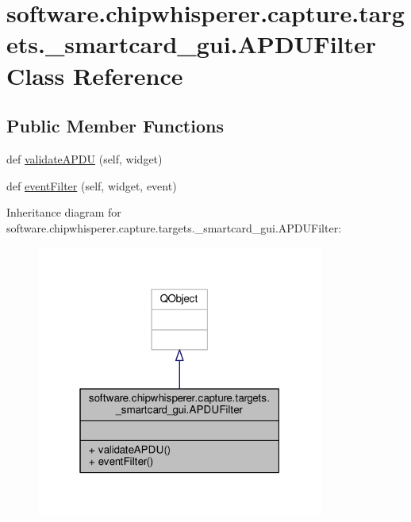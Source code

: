 \hypertarget{classsoftware_1_1chipwhisperer_1_1capture_1_1targets_1_1__smartcard__gui_1_1APDUFilter}{}\section{software.\+chipwhisperer.\+capture.\+targets.\+\_\+smartcard\+\_\+gui.\+A\+P\+D\+U\+Filter Class Reference}
\label{classsoftware_1_1chipwhisperer_1_1capture_1_1targets_1_1__smartcard__gui_1_1APDUFilter}
\subsection*{Public Member Functions}
\begin{DoxyCompactItemize}
\item 
def \hyperlink{classsoftware_1_1chipwhisperer_1_1capture_1_1targets_1_1__smartcard__gui_1_1APDUFilter_a7aae8aefbdc9d2d54c5d57c5d36e35f4}{validate\+A\+P\+D\+U} (self, widget)
\item 
def \hyperlink{classsoftware_1_1chipwhisperer_1_1capture_1_1targets_1_1__smartcard__gui_1_1APDUFilter_ab2fcf21f946b41b580b2ec0567988b2b}{event\+Filter} (self, widget, event)
\end{DoxyCompactItemize}


Inheritance diagram for software.\+chipwhisperer.\+capture.\+targets.\+\_\+smartcard\+\_\+gui.\+A\+P\+D\+U\+Filter\+:\nopagebreak
\begin{figure}[H]
\begin{center}
\leavevmode
\includegraphics[width=268pt]{db/ddf/classsoftware_1_1chipwhisperer_1_1capture_1_1targets_1_1__smartcard__gui_1_1APDUFilter__inherit__graph}
\end{center}
\end{figure}



